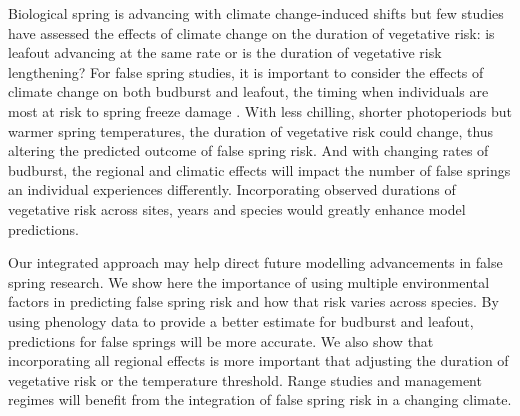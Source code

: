 \documentclass{article}\usepackage[]{graphicx}\usepackage[]{color}
\begin{document}
Biological spring is advancing with climate change-induced shifts but few studies have assessed the effects of climate change on the duration of vegetative risk: is leafout advancing at the same rate or is the duration of vegetative risk lengthening? For false spring studies, it is important to consider the effects of climate change on both budburst and leafout, the timing when individuals are most at risk to spring freeze damage \citep{Chamberlain2019,Lenz2016}. With less chilling, shorter photoperiods but warmer spring temperatures, the duration of vegetative risk could change, thus altering the predicted outcome of false spring risk. And with changing rates of budburst, the regional and climatic effects will impact the number of false springs an individual experiences differently. Incorporating observed durations of vegetative risk across sites, years and species would greatly enhance model predictions. 

Our integrated approach may help direct future modelling advancements in false spring research. We show here the importance of using multiple environmental factors in predicting false spring risk and how that risk varies across species. By using phenology data to provide a better estimate for budburst and leafout, predictions for false springs will be more accurate. We also show that incorporating all regional effects is more important that adjusting the duration of vegetative risk or the temperature threshold. Range studies and management regimes will benefit from the integration of false spring risk in a changing climate. 

  
\end{document}
